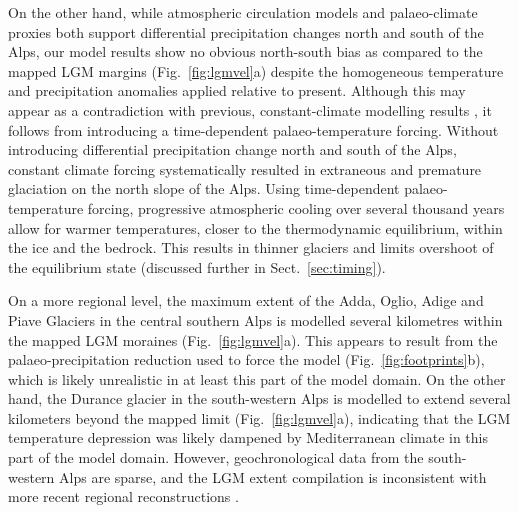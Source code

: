 \documentclass[tc, manuscript]{copernicus}
\begin{document}
    On the other hand, while atmospheric circulation models
    \citep{Strandberg.etal.2011, Ludwig.etal.2016} and palaeo-climate proxies
    \citep{Luetscher.etal.2015} both support differential precipitation changes
    north and south of the Alps, our model results show no obvious north-south
    bias as compared to the mapped LGM margins (Fig.~\ref{fig:lgmvel}a) despite
    the homogeneous temperature and precipitation anomalies applied relative to
    present. Although this may appear as a contradiction with previous,
    constant-climate modelling results \citep{Becker.etal.2016}, it follows
    from introducing a time-dependent palaeo-temperature forcing. Without
    introducing differential precipitation change north and south of the Alps,
    constant climate forcing systematically resulted in extraneous
    \citep[Fig.~3]{Becker.etal.2016} and premature
    \citep[Fig.~4]{Becker.etal.2016} glaciation on the north slope of the Alps.
    Using time-dependent palaeo-temperature forcing, progressive atmospheric
    cooling over several thousand years allow for warmer temperatures, closer to
    the thermodynamic equilibrium, within the ice and the bedrock. This results
    in thinner glaciers and limits overshoot of the equilibrium state
    (discussed further in Sect.~\ref{sec:timing}).

    On a more regional level, the maximum extent of the Adda, Oglio,
    Adige and Piave Glaciers in the central southern Alps is modelled
    several kilometres within the mapped LGM moraines (Fig.~\ref{fig:lgmvel}a).
    This appears to result
    from the palaeo-precipitation reduction used to force the model
    (Fig.~\ref{fig:footprints}b), which is likely unrealistic in at least this
    part of the model domain. On the other hand, the Durance glacier in the
    south-western Alps is modelled to extend several kilometers beyond the
    mapped limit (Fig.~\ref{fig:lgmvel}a), indicating that the LGM temperature
    depression was likely
    dampened by Mediterranean climate in this part of the model domain.
    However, geochronological data from the south-western Alps are sparse, and
    the LGM extent compilation \citep{Ehlers.Gibbard.2004} is inconsistent with
    more recent regional reconstructions \citep{Federici.etal.2017}.
\end{document}
